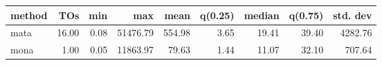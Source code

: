\begin{tabular}{lrrrrrrrr}
\hline
 method   &   TOs &   min &      max &   mean &   q(0.25) &   median &   q(0.75) &   std. dev \\
\hline
 mata     & 16.00 &  0.08 & 51476.79 & 554.98 &      3.65 &    19.41 &     39.40 &    4282.76 \\
 mona     &  1.00 &  0.05 & 11863.97 &  79.63 &      1.44 &    11.07 &     32.10 &     707.64 \\
\hline
\end{tabular}
